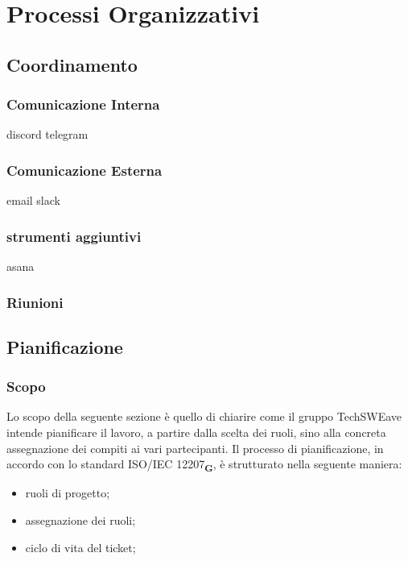 \section{Processi Organizzativi}
\subsection{Coordinamento}
\subsubsection{Comunicazione Interna}
discord
telegram
\subsubsection{Comunicazione Esterna}
email
slack
\subsubsection{strumenti aggiuntivi}
asana
\subsubsection{Riunioni}
\subsection{Pianificazione}
\subsubsection{Scopo}
Lo scopo della seguente sezione è quello di chiarire come il gruppo TechSWEave intende
pianificare il lavoro, a partire dalla scelta dei ruoli, sino alla concreta assegnazione dei
compiti ai vari partecipanti.
Il processo di pianificazione, in accordo con lo standard ISO/IEC 12207\textsubscript{\textbf{G}}, è strutturato nella seguente maniera:
\begin {itemize}
    \item ruoli di progetto;
    \item assegnazione dei ruoli;
    \item ciclo di vita del ticket;
\end {itemize}
